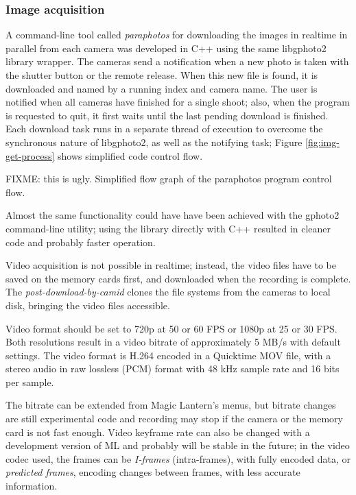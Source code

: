 
\subsubsection{Image acquisition} %


A command-line tool called \emph{paraphotos} for downloading the images in realtime in parallel from each camera was developed in C++ using the same libgphoto2 library wrapper.
The cameras send a notification when a new photo is taken with the shutter button or the remote release.
When this new file is found, it is downloaded and named by a running index and camera name.
The user is notified when all cameras have finished for a single shoot; also, when the program is requested to quit, it first waits until the last pending download is finished.
Each download task runs in a separate thread of execution to overcome the synchronous nature of libgphoto2, as well as the notifying task; Figure \ref{fig:img-get-process} shows simplified code control flow.

{FIXME: this is ugly. Simplified flow graph of the paraphotos program control flow.}

Almost the same functionality could have have been achieved with the gphoto2 command-line utility; using the library directly with C++ resulted in cleaner code and probably faster operation.

Video acquisition is not possible in realtime; instead, the video files have to be saved on the memory cards first, and downloaded when the recording is complete.
The \emph{post-download-by-camid} clones the file systems from the cameras to local disk, bringing the video files accessible.

Video format should be set to 720p at 50 or 60 FPS or 1080p at 25 or 30 FPS.
Both resolutions result in a video bitrate of approximately 5 MB/s with default settings.
The video format is H.264 encoded in a Quicktime MOV file, with a stereo audio in raw lossless (PCM) format with 48 kHz sample rate and 16 bits per sample.

The bitrate can be extended from Magic Lantern's menus, but bitrate changes are still experimental code and recording may stop if the camera or the memory card is not fast enough.
Video keyframe rate can also be changed with a development version of ML and probably will be stable in the future;
in the video codec used, the frames can be \emph{I-frames} (intra-frames), with fully encoded data, or \emph{predicted frames}, encoding changes between frames, with less accurate information.

